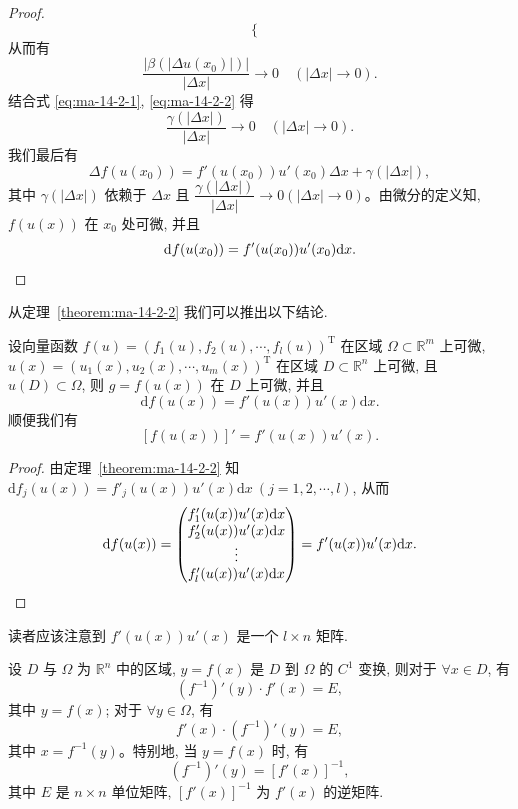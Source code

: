\begin{proof}
\[\begin{cases}
  \end{cases}
\]
从而有
\begin{equation}
  \frac{|\beta(|\Delta u(x_0)|)|}{|\Delta x|}\to0
  \quad(|\Delta x|\to0).
\label{eq:ma-14-2-2}
\end{equation}
结合式 \eqref{eq:ma-14-2-1}, \eqref{eq:ma-14-2-2} 得
\[
  \frac{\gamma(|\Delta x|)}{|\Delta x|}\to0\quad(|\Delta x|\to0).
\]
我们最后有
\[
  \Delta f(u(x_0))=f'(u(x_0))u'(x_0)\Delta x+\gamma(|\Delta x|),
\]
其中 $\gamma(|\Delta x|)$ 依赖于 $\Delta x$ 且 $\dfrac{\gamma(|\Delta x|)}{|\Delta x|}\to0(|\Delta x|\to0)$。由微分的定义知, $f(u(x))$ 在 $x_0$ 处可微, 并且
\[
  \mathrm df(u(x_0))=f'(u(x_0))u'(x_0)\mathrm dx.
\qedhere
\]
\end{proof}


从定理~\ref{theorem:ma-14-2-2} 我们可以推出以下结论.

\begin{corollary}\label{corollary:ma-local-14.2-1}
设向量函数 $f(u)=(f_1(u),f_2(u),\cdots,f_l(u))^\mathrm T$ 在区域 $\Omega\subset\mathbb R^m$ 上可微, $u(x)=(u_1(x),u_2(x),\cdots,u_m(x))^\mathrm T$ 在区域 $D\subset\mathbb R^n$ 上可微, 且 $u(D)\subset\Omega$, 则 $g=f(u(x))$ 在 $D$ 上可微, 并且
\[
  \mathrm df(u(x))=f'(u(x))u'(x)\mathrm dx.
\]
顺便我们有
\[
  [f(u(x))]'=f'(u(x))u'(x).
\]
\end{corollary}


\begin{proof}
由定理~\ref{theorem:ma-14-2-2} 知 $\mathrm df_j(u(x))=f'_j(u(x))u'(x)\mathrm dx\ (j=1,2,\cdots,l)$, 从而
\[
  \mathrm df(u(x))=
  \begin{pmatrix}
    f'_1(u(x))u'(x)\mathrm dx\\
    f'_2(u(x))u'(x)\mathrm dx\\
    \vdots\\
    f'_l(u(x))u'(x)\mathrm dx
  \end{pmatrix}
  =f'(u(x))u'(x)\mathrm dx.
\qedhere
\]
\end{proof}


\begin{remark}\label{remark:ma-14-source-40}
读者应该注意到 $f'(u(x))u'(x)$ 是一个 $l\times n$ 矩阵.
\end{remark}


\begin{corollary}\label{corollary:ma-local-14.2-2}
设 $D$ 与 $\Omega$ 为 $\mathbb R^n$ 中的区域, $y=f(x)$ 是 $D$ 到 $\Omega$ 的 $C^1$ 变换, 则对于 $\forall x\in D$, 有
\begin{equation}
  (f^{-1})'(y)\cdot f'(x)=E,
\label{eq:ma-14-2-3}
\end{equation}
其中 $y=f(x)$; 对于 $\forall y\in\Omega$, 有
\begin{equation}
  f'(x)\cdot(f^{-1})'(y)=E,
\label{eq:ma-14-2-4}
\end{equation}
其中 $x=f^{-1}(y)$。特别地, 当 $y=f(x)$ 时, 有
\begin{equation}
  (f^{-1})'(y)=[f'(x)]^{-1},
\label{eq:ma-14-2-5}
\end{equation}
其中 $E$ 是 $n\times n$ 单位矩阵, $[f'(x)]^{-1}$ 为 $f'(x)$ 的逆矩阵.
\end{corollary}


